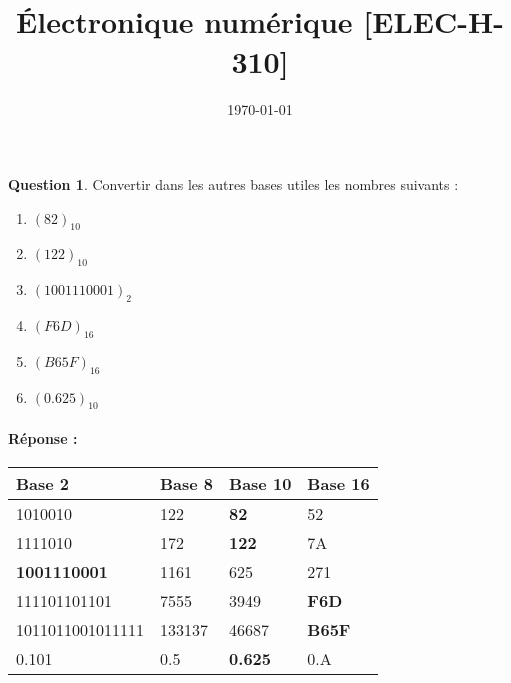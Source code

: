 \documentclass[11pt,a4paper]{article}
\date{\vspace{-1.7cm}\mydate\today}
\title{\vspace{-2cm} \tpnumber\\ Électronique numérique [ELEC-H-310] \ifthenelse{\boolean{corrige}}{~\\Corrigé}{}}
\theoremstyle{definition}%
\newtheorem{Q}{Question}[] %
\newcommand{\reponse}[1]{%
	\ifthenelse {\boolean{corrige}} {\paragraph{Réponse :} \color{darkblue}   #1\color{black}} {}
 }
\begin{document}
\pagestyle{empty}
\maketitle
\vspace*{-1cm}

\begin{Q}
	Convertir dans les autres bases utiles les nombres suivants :
	\begin{enumerate}
	\item $(82)_{10}$
	\item $(122)_{10}$
	\item $(1001110001)_2$
	\item $(F6D)_{16}$
	\item $(B65F)_{16}$
	\item $(0.625)_{10}$
	\end{enumerate}

	\reponse{
		\begin{center}
			\begin{tabular}{|l|l|l|l|}\hline
				Base 2 & Base 8 & Base 10 & Base 16 \\ \hline
				1010010 & 122 & \textbf{82} & 52 \\ \hline
				1111010 & 172 & \textbf{122} & 7A \\ \hline
				\textbf{1001110001} & 1161 & 625 & 271 \\ \hline
				111101101101 & 7555 & 3949 & \textbf{F6D} \\ \hline
				1011011001011111 & 133137 & 46687 & \textbf{B65F} \\ \hline
				0.101 & 0.5 & \textbf{0.625} & 0.A \\ \hline
			\end{tabular}
		\end{center}
	}
\end{Q}
\end{document}
